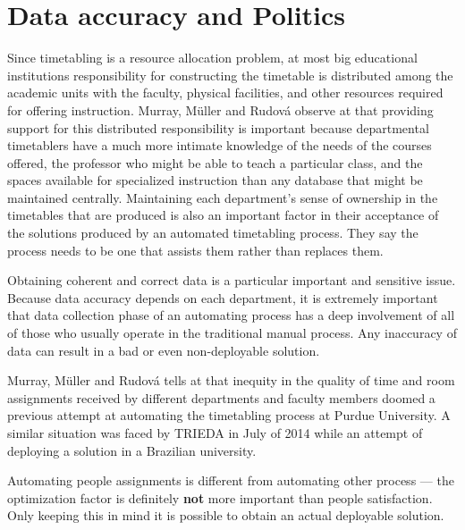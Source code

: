 \section{Data accuracy and Politics}
\label{sec:accuracy}

Since timetabling is a resource allocation problem, at most big educational institutions responsibility for constructing the timetable is distributed among the academic units with the faculty, physical facilities, and other resources required for offering instruction. Murray, M\"{u}ller and Rudov\'{a} observe at \cite{Murray2007} that providing support for this distributed responsibility is important because departmental timetablers have a much more intimate knowledge of the needs of the courses offered, the professor who might be able to teach a particular class, and the spaces available for specialized instruction than any database that might be maintained centrally. Maintaining each department's sense of ownership in the timetables that are produced is also an important factor in their acceptance of the solutions produced by an automated timetabling process. They say the process needs to be one that assists them rather than replaces them.

Obtaining coherent and correct data is a particular important and sensitive issue. Because data accuracy depends on each department, it is extremely important that data collection phase of an automating process has a deep involvement of all of those who usually operate in the traditional manual process. Any inaccuracy of data can result in a bad or even non-deployable solution.


Murray, M\"{u}ller and Rudov\'{a} tells at \cite{Murray2007} that inequity in the quality of time and room assignments received by different departments and faculty members doomed a previous attempt at automating the timetabling process at Purdue University. A similar situation was faced by TRIEDA in July of 2014 while an attempt of deploying a solution in a Brazilian university.

Automating people assignments is different from automating other process --- the optimization factor is definitely \textbf{not} more important than people satisfaction. Only keeping this in mind it is possible to obtain an actual deployable solution.

